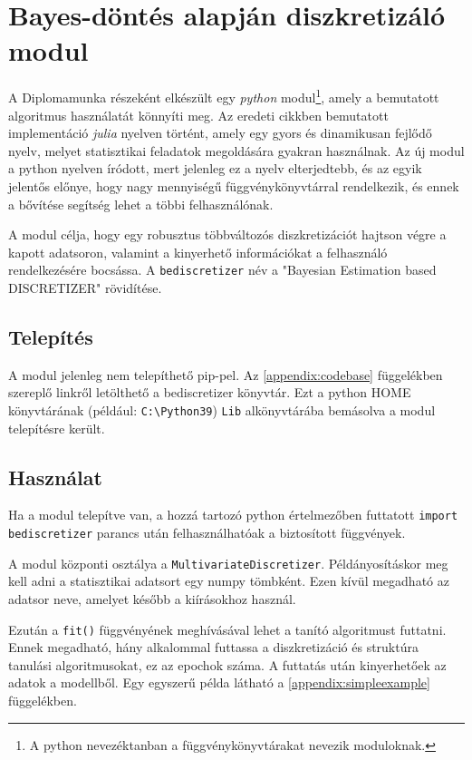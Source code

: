 \chapter{Bayes-döntés alapján diszkretizáló modul}\label{chapter:modul}

\iffalse
A Diplomamunka részeként elkészült egy \textit{python} modul\footnote{A python nevezéktanban a függvénykönyvtárakat nevezik moduloknak.}, amely a bemutatott algoritmus használatát könnyíti meg. Az eredeti cikkben bemutatott implementáció \textit{julia} nyelven történt, amely egy gyors és dinamikusan fejlődő nyelv, melyet statisztikai feladatok megoldására gyakran használnak. Az új modul a python nyelven íródott, mert jelenleg ez a nyelv elterjedtebb, és az egyik jelentős előnye, hogy nagy mennyiségű függvénykönyvtárral rendelkezik, és ennek a bővítése segítség lehet a többi felhasználónak.

A modul célja, hogy egy robusztus többváltozós diszkretizációt hajtson végre a kapott adatsoron, valamint a kinyerhető információkat a felhasználó rendelkezésére bocsássa. A \verb|bediscretizer| név a "Bayesian Estimation based DISCRETIZER" rövidítése.

\section{Telepítés}
A modul jelenleg nem telepíthető pip-pel. Az \ref{appendix:codebase} függelékben szereplő linkről letölthető a bediscretizer könyvtár. Ezt a python HOME könyvtárának (például: \verb|C:\Python39|) \verb|Lib| alkönyvtárába bemásolva a modul telepítésre került.

\section{Használat}
Ha a modul telepítve van, a hozzá tartozó python értelmezőben futtatott \verb|import bediscretizer| parancs után felhasználhatóak a biztosított függvények.

A modul központi osztálya a \verb|MultivariateDiscretizer|. Példányosításkor meg kell adni a statisztikai adatsort egy numpy tömbként. Ezen kívül megadható az adatsor neve, amelyet később a kiírásokhoz használ.

Ezután a \verb|fit()| függvényének meghívásával lehet a tanító algoritmust futtatni. Ennek megadható, hány alkalommal futtassa a diszkretizáció és struktúra tanulási algoritmusokat, ez az epochok száma.
A futtatás után kinyerhetőek az adatok a modellből. Egy egyszerű példa látható a \ref{appendix:simpleexample} függelékben.

